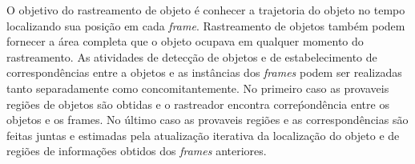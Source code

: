 	O objetivo do rastreamento de objeto é conhecer a trajetoria do objeto no tempo localizando sua posição em cada \textit{frame}. Rastreamento de objetos também podem fornecer a área completa que o objeto ocupava em qualquer momento do rastreamento. As atividades de detecção de objetos e de estabelecimento de correspondências entre a objetos e as instâncias dos \textit{frames} podem ser realizadas tanto separadamente como concomitantemente. No primeiro caso as provaveis regiões de objetos são obtidas e o rastreador encontra correṕondência entre os objetos e os frames. No último caso as provaveis regiões e as correspondências são feitas juntas e estimadas pela atualização iterativa da localização do objeto e de regiões de informações obtidos dos \textit{frames} anteriores.






